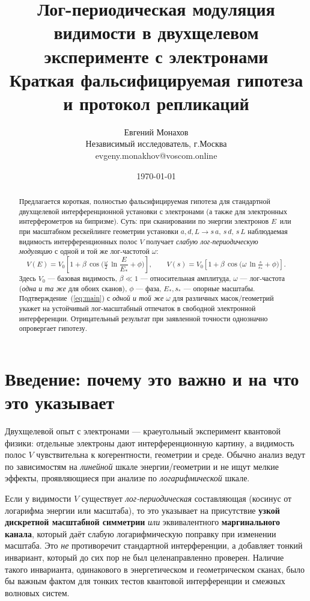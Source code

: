 \documentclass[a4paper,12pt]{article}
\title{Лог-периодическая модуляция видимости в двухщелевом эксперименте с электронами\\[2mm]
\large Краткая фальсифицируемая гипотеза и протокол репликаций}
\author{Евгений Монахов \\ Независимый исследователь, г.Москва \\ evgeny.monakhov@voscom.online}
\date{\today}
\begin{document}
\maketitle

\begin{abstract}
Предлагается короткая, полностью фальсифицируемая гипотеза для стандартной двухщелевой
интерференционной установки с электронами (а также для электронных интерферометров на бипризме).
Суть: при сканировании по энергии электронов $E$ \,или при масштабном рескейлинге геометрии установки
$a,d,L \to s\,a,\,s\,d,\,s\,L$ наблюдаемая видимость интерференционных полос $V$ получает
\emph{слабую лог-периодическую модуляцию} с одной и той же лог-частотой $\omega$:
\begin{equation}
\label{eq:main}
V(E)=V_0\!\left[1+\beta\,\cos\!\Big(\tfrac{\omega}{2}\,\ln\!\frac{E}{E_{\ast}}+\phi\Big)\right],
\qquad
V(s)=V_0\!\left[1+\beta\,\cos\!\big(\omega\,\ln\!\tfrac{s}{s_{\ast}}+\phi\big)\right].
\end{equation}
Здесь $V_0$ --- базовая видимость, $\beta\ll 1$ --- относительная амплитуда, $\omega$ --- лог-частота (\emph{одна и та же}
для обоих сканов), $\phi$ --- фаза, $E_{\ast},s_{\ast}$ --- опорные масштабы. Подтверждение~(\ref{eq:main})
с \emph{одной и той же} $\omega$ для различных масок/геометрий укажет на устойчивый лог-масштабный отпечаток
в свободной электронной интерференции. Отрицательный результат при заявленной точности однозначно опровергает гипотезу.
\end{abstract}

\section{Введение: почему это важно и на что это указывает}
Двухщелевой опыт с электронами --- краеугольный эксперимент квантовой физики: отдельные электроны дают
интерференционную картину, а видимость полос $V$ чувствительна к когерентности, геометрии и среде.
Обычно анализ ведут по зависимостям на \emph{линейной} шкале энергии/геометрии и не ищут
мелкие эффекты, проявляющиеся при анализе по \emph{логарифмической} шкале.

Если у видимости $V$ существует \emph{лог-периодическая} составляющая (косинус от логарифма энергии или масштаба),
то это указывает на присутствие \textbf{узкой дискретной масштабной симметрии} \emph{или}
эквивалентного \textbf{маргинального канала}, который даёт слабую логарифмическую поправку при изменении масштаба.
Это \emph{не} противоречит стандартной интерференции, а добавляет тонкий инвариант, который до сих пор
не был целенаправленно проверен. Наличие такого инварианта, одинакового в энергетическом и геометрическом сканах,
было бы важным фактом для тонких тестов квантовой интерференции и смежных волновых систем.
\end{document}
